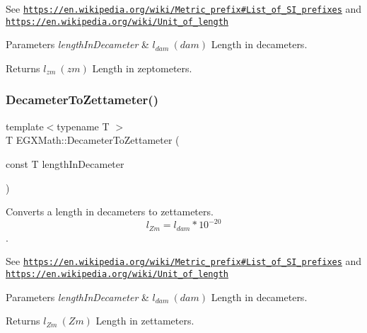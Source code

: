 See \href{https://en.wikipedia.org/wiki/Metric_prefix#List_of_SI_prefixes}{\tt https\+://en.\+wikipedia.\+org/wiki/\+Metric\+\_\+prefix\#\+List\+\_\+of\+\_\+\+S\+I\+\_\+prefixes} and \href{https://en.wikipedia.org/wiki/Unit_of_length}{\tt https\+://en.\+wikipedia.\+org/wiki/\+Unit\+\_\+of\+\_\+length} 
\begin{DoxyParams}{Parameters}
{\em length\+In\+Decameter} & $ l_{dam}\ (dam)$ Length in decameters. \\
\hline
\end{DoxyParams}
\begin{DoxyReturn}{Returns}
$ l_{zm}\ (zm)$ Length in zeptometers. 
\end{DoxyReturn}
\mbox{\label{group___e_g_x_math-_conversions-_length_conversions-_decameter-_s_i_ga63a6a9ec3ac42c9837818b82b1fdbcbb}} 
\subsubsection{\texorpdfstring{Decameter\+To\+Zettameter()}{DecameterToZettameter()}}
{\footnotesize\ttfamily template$<$typename T $>$ \\
T E\+G\+X\+Math\+::\+Decameter\+To\+Zettameter (\begin{DoxyParamCaption}\item[{const T}]{length\+In\+Decameter }\end{DoxyParamCaption})}



Converts a length in decameters to zettameters. \[ l_{Zm}=l_{dam} * 10^{-20} \]. 

See \href{https://en.wikipedia.org/wiki/Metric_prefix#List_of_SI_prefixes}{\tt https\+://en.\+wikipedia.\+org/wiki/\+Metric\+\_\+prefix\#\+List\+\_\+of\+\_\+\+S\+I\+\_\+prefixes} and \href{https://en.wikipedia.org/wiki/Unit_of_length}{\tt https\+://en.\+wikipedia.\+org/wiki/\+Unit\+\_\+of\+\_\+length} 
\begin{DoxyParams}{Parameters}
{\em length\+In\+Decameter} & $ l_{dam}\ (dam)$ Length in decameters. \\
\hline
\end{DoxyParams}
\begin{DoxyReturn}{Returns}
$ l_{Zm}\ (Zm)$ Length in zettameters. 
\end{DoxyReturn}
